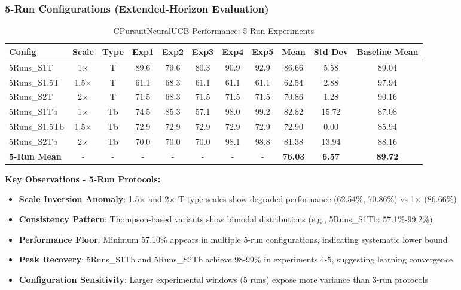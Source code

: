 \documentclass[12pt,a4paper]{article}
\newcommand{\primarytext}[1]{\textcolor{primaryblue}{\textbf{#1}}}
\newcommand{\secondarytext}[1]{\textcolor{secondaryblue}{\textbf{#1}}}
\newcommand{\success}[1]{\textcolor{accentgreen}{\textbf{#1}}}
\newcommand{\warning}[1]{\textcolor{warningred}{\textbf{#1}}}
\begin{document}
\subsubsection{5-Run Configurations (Extended-Horizon Evaluation)}

\begin{table}[H]
\centering
\caption{CPursuitNeuralUCB Performance: 5-Run Experiments}
\label{tab:5run_performance}
\begin{tabular}{@{}lcccccccccc@{}}
\toprule
\textbf{Config} & \textbf{Scale} & \textbf{Type} & \textbf{Exp1} & \textbf{Exp2} & \textbf{Exp3} & \textbf{Exp4} & \textbf{Exp5} & \textbf{Mean} & \textbf{Std Dev} & \textbf{Baseline Mean} \\
\midrule
5Runs\_S1T & 1× & T & 89.6 & 79.6 & 80.3 & 90.9 & 92.9 & 86.66 & 5.58 & 89.04 \\
5Runs\_S1.5T & 1.5× & T & 61.1 & 68.3 & 61.1 & 61.1 & 61.1 & 62.54 & 2.88 & 97.94 \\
5Runs\_S2T & 2× & T & 71.5 & 68.3 & 71.5 & 71.5 & 71.5 & 70.86 & 1.28 & 90.16 \\
5Runs\_S1Tb & 1× & Tb & 74.5 & 85.3 & 57.1 & 98.0 & 99.2 & 82.82 & 15.72 & 87.08 \\
5Runs\_S1.5Tb & 1.5× & Tb & 72.9 & 72.9 & 72.9 & 72.9 & 72.9 & 72.90 & 0.00 & 85.94 \\
5Runs\_S2Tb & 2× & Tb & 70.0 & 70.0 & 70.0 & 98.1 & 98.8 & 81.38 & 13.94 & 88.16 \\
\midrule
\textbf{5-Run Mean} & - & - & - & - & - & - & - & \textbf{76.03} & \textbf{6.57} & \textbf{89.72} \\
\bottomrule
\end{tabular}
\end{table}

\textbf{Key Observations - 5-Run Protocols:}
\begin{itemize}
\item \warning{Scale Inversion Anomaly}: 1.5× and 2× T-type scales show degraded performance (62.54\%, 70.86\%) vs 1× (86.66\%)
\item \primarytext{Consistency Pattern}: Thompson-based variants show bimodal distributions (e.g., 5Runs\_S1Tb: 57.1\%-99.2\%)
\item \warning{Performance Floor}: Minimum 57.10\% appears in multiple 5-run configurations, indicating systematic lower bound
\item \success{Peak Recovery}: 5Runs\_S1Tb and 5Runs\_S2Tb achieve 98-99\% in experiments 4-5, suggesting learning convergence
\item \secondarytext{Configuration Sensitivity}: Larger experimental windows (5 runs) expose more variance than 3-run protocols
\end{itemize}
\end{document}
